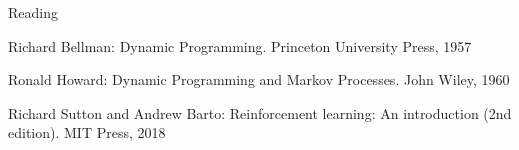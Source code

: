 \begin{frame}{Reading}

Richard Bellman: Dynamic Programming. Princeton University Press, 1957

Ronald Howard: Dynamic Programming and Markov Processes. John Wiley, 1960

Richard Sutton and Andrew Barto: Reinforcement learning: An introduction (2nd edition). MIT Press, 2018

\end{frame}

